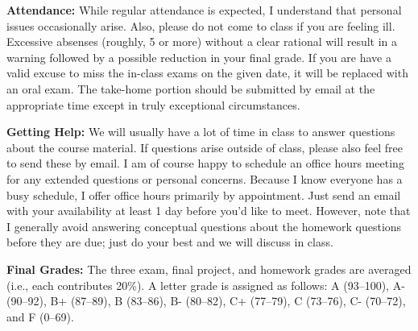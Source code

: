 \documentclass[11pt, a4paper]{article}
\begin{document}
\bigskip

\textbf{Attendance:}
While regular attendance is expected, I understand that personal issues 
occasionally arise. Also, please do not come to class if you are feeling ill.
Excessive absenses (roughly, 5 or more) without a clear rational will result
in a warning followed by a possible reduction in your final grade. If you are
have a valid excuse to miss the in-class exams on the given date, it will be
replaced with an oral exam. The take-home portion should be submitted by email
at the appropriate time except in truly exceptional circumstances.

\bigskip

\textbf{Getting Help:}
We will usually have a lot of time in class to answer questions about the course
material. If questions arise outside of class, please also feel free to send
these by email. I am of course happy to schedule an office hours meeting for
any extended questions or personal concerns. Because I know everyone has a
busy schedule, I offer office hours primarily by appointment. Just send an
email with your availability at least 1 day before you'd like to meet. However,
note that I generally avoid answering conceptual questions about the homework
questions before they are due; just do your best and we will discuss in class.

\bigskip

\textbf{Final Grades:}
The three exam, final project, and homework grades are averaged (i.e., each
contributes 20\%). A letter grade is assigned as follows:
             A (93--100), A- (90--92),
B+ (87--89), B (83--86),  B- (80--82),
C+ (77--79), C (73--76),  C- (70--72), and F (0--69).
\end{document}
